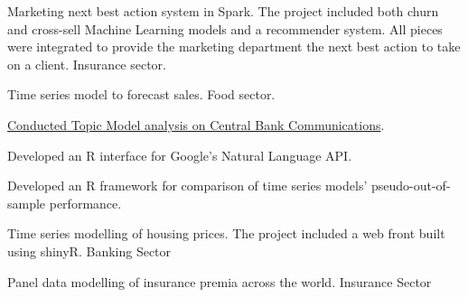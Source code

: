 \documentclass[]{deedy-resume-openfont}
\begin{document}
\begin{minipage}[t]{0.66\textwidth}
\vspace{\topsep} %
\begin{tightemize}
\item Marketing next best action system in Spark. The project included both churn and cross-sell Machine Learning
models and a recommender system. All pieces were integrated to provide the marketing department the next
best action to take on a client.
Insurance sector.
\item Time series model to forecast sales. Food sector.
\end{tightemize}
\sectionsep

\begin{tightemize}
\item \href{
https://www.bbvaresearch.com/en/publicaciones/how-do-the-emerging-markets-central-bank-talk-a-big-data-approach-to-the-cb-of-turkey/
}
  {Conducted Topic Model analysis on Central Bank Communications}. 
\item Developed an R interface for Google's Natural Language API.
\item Developed an R framework for comparison of time series models' 
  pseudo-out-of-sample performance.
\end{tightemize}
\sectionsep

\begin{tightemize}
\item Time series modelling of housing prices. The project included a web front built using shinyR. Banking Sector
\item Panel data modelling of insurance premia across the world. Insurance Sector
\end{tightemize}
\sectionsep


\end{minipage}
\end{document}

